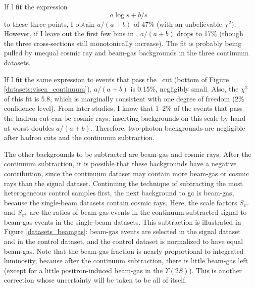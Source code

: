 If I fit the expression
\begin{equation}
  a \log s + b/s \label{datasets:visen_continuum_fitfunc}
\end{equation}
to these three points, I obtain $a/(a+b)$ of 47\% (with an
unbelievable $\chi^2$).  However, if I leave out the first few bins in
\visen, $a/(a+b)$ drops to 17\% (though the three cross-sections still
monotonically increase).  The fit is probably being pulled by unequal
cosmic ray and beam-gas backgrounds in the three continuum datasets.

If I fit the same expression to events that pass the \visen\ cut
(bottom of Figure \ref{datasets:visen_continuum}), $a/(a+b)$ is
0.15\%, negligibly small.  Also, the $\chi^2$ of this fit is 5.8,
which is marginally consistent with one degree of freedom (2\%
confidence level).  From later studies, I know that 1--2\% of the
events that pass the hadron cut can be cosmic rays; inserting
backgrounds on this scale by hand at worst doubles $a/(a+b)$.
Therefore, two-photon backgrounds are negligible after hadron cuts and
the continuum subtraction.

The other backgrounds to be subtracted are beam-gas and cosmic rays.
After the continuum subtraction, it is possible that these backgrounds
have a negative contribution, since the continuum dataset may contain
more beam-gas or cosmic rays than the signal dataset.  Continuing the
technique of subtracting the most heterogeneous control samples first,
the next background to go is beam-gas, because the single-beam
datasets contain cosmic rays.  Here, the scale factors $S_{e^-}$ and
$S_{e^+}$ are the ratios of beam-gas events in the
continuum-subtracted signal to beam-gas events in the single-beam
datasets.  This subtraction is illustrated in Figure
\ref{datasets_beamgas}: beam-gas events are selected in the signal
dataset and in the control dataset, and the control dataset is
normalized to have equal beam-gas.  Note that the beam-gas fraction is
nearly proportional to integrated luminosity, because after the
continuum subtraction, there is little beam-gas left (except for a
little positron-induced beam-gas in the $\Upsilon(2S)$).  This is
another correction whose uncertainty will be taken to be all of
itself.


